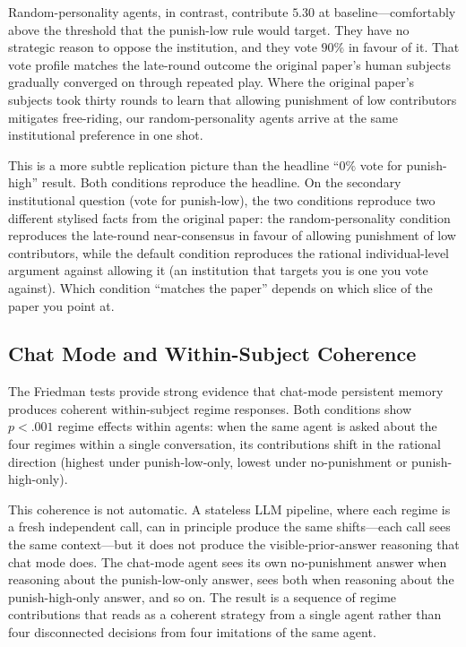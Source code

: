\documentclass[12pt, a4paper]{article}
\begin{document}
Random-personality agents, in contrast, contribute $5.30$ at baseline---comfortably above the threshold that the punish-low rule would target. They have no strategic reason to oppose the institution, and they vote $90\%$ in favour of it. That vote profile matches the late-round outcome the original paper's human subjects gradually converged on through repeated play. Where the original paper's subjects took thirty rounds to learn that allowing punishment of low contributors mitigates free-riding, our random-personality agents arrive at the same institutional preference in one shot.

This is a more subtle replication picture than the headline ``$0\%$ vote for punish-high'' result. Both conditions reproduce the headline. On the secondary institutional question (vote for punish-low), the two conditions reproduce two different stylised facts from the original paper: the random-personality condition reproduces the late-round near-consensus in favour of allowing punishment of low contributors, while the default condition reproduces the rational individual-level argument against allowing it (an institution that targets you is one you vote against). Which condition ``matches the paper'' depends on which slice of the paper you point at.

\subsection{Chat Mode and Within-Subject Coherence}

The Friedman tests provide strong evidence that chat-mode persistent memory produces coherent within-subject regime responses. Both conditions show $p<.001$ regime effects within agents: when the same agent is asked about the four regimes within a single conversation, its contributions shift in the rational direction (highest under punish-low-only, lowest under no-punishment or punish-high-only).

This coherence is not automatic. A stateless LLM pipeline, where each regime is a fresh independent call, can in principle produce the same shifts---each call sees the same context---but it does not produce the visible-prior-answer reasoning that chat mode does. The chat-mode agent sees its own no-punishment answer when reasoning about the punish-low-only answer, sees both when reasoning about the punish-high-only answer, and so on. The result is a sequence of regime contributions that reads as a coherent strategy from a single agent rather than four disconnected decisions from four imitations of the same agent.
\end{document}
